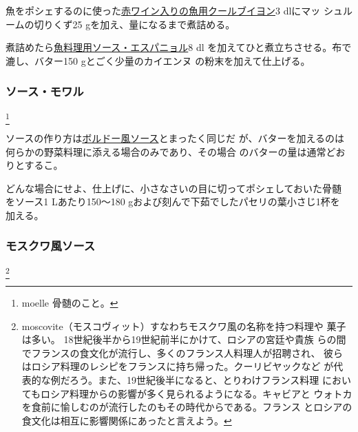 \begin{recette}

魚をポシェするのに使った\protect\hyperlink{court-bouillon-c}{赤ワイン入りの魚用クールブイヨン}3
dlにマッ シュルームの切りくず25
gを加え、\untiers{}量になるまで煮詰める。

煮詰めたら\protect\hyperlink{sauce-espagnole-maigre}{魚料理用ソース・エスパニョル}8
dl を加えてひと煮立ちさせる。布で漉し、バター150 gとごく少量のカイエンヌ
の粉末を加えて仕上げる。

\hypertarget{sauce-moelle}{%
\subsubsection{ソース・モワル}\label{sauce-moelle}}

\footnote{moelle 骨髄のこと。}


ソースの作り方は\protect\hyperlink{sauce-bordelaise}{ボルドー風ソース}とまったく同じだ
が、バターを加えるのは何らかの野菜料理に添える場合のみであり、その場合
のバターの量は通常どおりとするこ。

どんな場合にせよ、仕上げに、小さなさいの目に切ってポシェしておいた骨髄
をソース1 Lあたり150〜180 gおよび刻んで下茹でしたパセリの葉小さじ1杯を
加える。

\hypertarget{sauce-moscovite}{%
\subsubsection{モスクワ風ソース}\label{sauce-moscovite}}

\footnote{moscovite（モスコヴィット）すなわちモスクワ風の名称を持つ料理や
  菓子は多い。 18世紀後半から19世紀前半にかけて、ロシアの宮廷や貴族
  らの間でフランスの食文化が流行し、多くのフランス人料理人が招聘され、
  彼らはロシア料理のレシピをフランスに持ち帰った。クーリビヤックなど
  が代表的な例だろう。また、19世紀後半になると、とりわけフランス料理
  においてもロシア料理からの影響が多く見られるようになる。キャビアと
  ウォトカを食前に愉しむのが流行したのもその時代からである。フランス
  とロシアの食文化は相互に影響関係にあったと言えよう。}


\end{recette}
